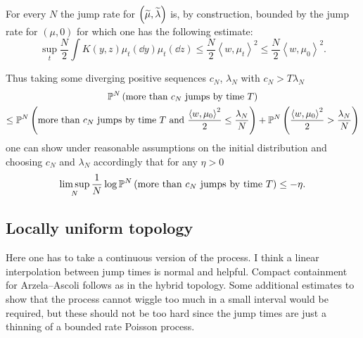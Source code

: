 For every $N$ the jump rate for $\left(\widetilde{\mu}, \widetilde{\lambda}\right)$ is, by construction, bounded by the jump rate for $(\mu, 0)$ for which one has the following estimate:
\begin{equation}\label{eq:rate-bound1}
    \sup_t \frac{N}{2}\int K(y,z)\mu_t(\dd y) \mu_t(\dd z)
    \leq
    \frac{N}{2} \left<w, \mu_t \right>^2
    \leq
    \frac{N}{2} \left<w, \mu_0 \right>^2.
\end{equation}

Thus taking some diverging positive sequences $c_N$, $\lambda_N$ with $c_N > T \lambda_N$
\begin{multline*}
    \mathbb{P}^N\left(\text{more than } c_N \text{ jumps by time } T\right)\\
    \leq
    \mathbb{P}^N\left(\text{more than } c_N \text{ jumps by time } T \text{ and } 
              \frac{\left<w, \mu_0 \right>^2}{2} \leq \frac{\lambda_N}{N}\right)
    + \mathbb{P}^N\left(\frac{\left<w, \mu_0 \right>^2}{2} > \frac{\lambda_N}{N}\right)
\end{multline*}
one can show under reasonable assumptions on the initial distribution and choosing $c_N$ and $\lambda_N$ accordingly that for any $\eta > 0$
\begin{equation}\label{eq:rate-bound}
    \limsup_N \frac1N \log \mathbb{P}^N\left(\text{more than } c_N \text{ jumps by time } T\right) \leq - \eta.
\end{equation}



\subsection{Locally uniform topology}
Here one has to take a continuous version of the process.
I think a linear interpolation between jump times is normal and helpful.
Compact containment for Arzela--Ascoli follows as in the hybrid topology.
Some additional estimates to show that the process cannot wiggle too much in a small interval would be required, but these should not be too hard since the jump times are just a thinning of a bounded rate Poisson process.